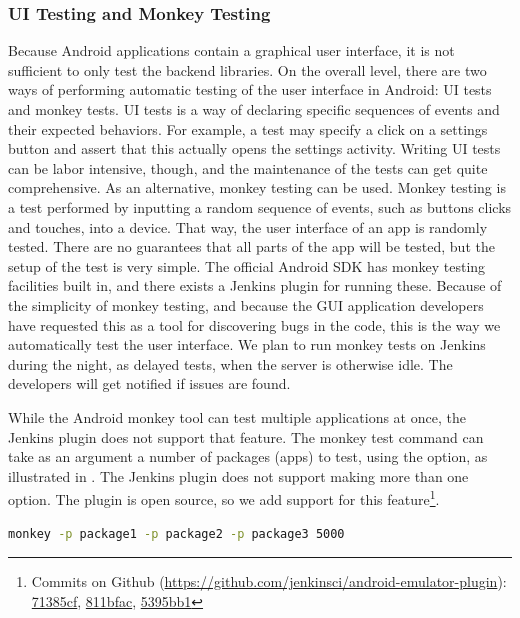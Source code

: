 \subsubsection{UI Testing and Monkey Testing}
Because Android applications contain a graphical user interface, it is not sufficient to only test the backend libraries. On the overall level, there are two ways of performing automatic testing of the user interface in Android: UI tests and monkey tests. UI tests is a way of declaring specific sequences of events and their expected behaviors. For example, a test may specify a click on a settings button and assert that this actually opens the settings activity. Writing UI tests can be labor intensive, though, and the maintenance of the tests can get quite comprehensive. As an alternative, monkey testing can be used. Monkey testing is a test performed by inputting a random sequence of events, such as buttons clicks and touches, into a device. That way, the user interface of an app is randomly tested. There are no guarantees that all parts of the app will be tested, but the setup of the test is very simple. The official Android SDK has monkey testing facilities built in, and there exists a Jenkins plugin for running these. Because of the simplicity of monkey testing, and because the GUI application developers have requested this as a tool for discovering bugs in the code, this is the way we automatically test the user interface. We plan to run monkey tests on Jenkins during the night, as delayed tests, when the server is otherwise idle. The developers will get notified if issues are found.

While the Android monkey tool can test multiple applications at once, the Jenkins plugin does not support that feature. The monkey test command can take as an argument a number of packages (apps) to test, using the  option, as illustrated in . The Jenkins plugin does not support making more than one  option. The plugin is open source, so we add support for this feature\footnote{Commits on Github (\url{https://github.com/jenkinsci/android-emulator-plugin}): \href{https://github.com/jenkinsci/android-emulator-plugin/commit/71385cfb3e3bb4dfa6d11170c52ee69808a4f72f}{71385cf},  \href{https://github.com/jenkinsci/android-emulator-plugin/commit/811bfac657565b25ce2f7fc9d6399d9f22bb6042}{811bfac}, \href{https://github.com/jenkinsci/android-emulator-plugin/commit/5395bb1fd23032cab48a7bfff61a26544f078785}{5395bb1}}.

\begin{lstlisting}[language=bash,showstringspaces=false,caption=Running monkey test on several packages. The number 5000 at the end is the number of events to generate.,label=lst:monkey_packages]
monkey -p package1 -p package2 -p package3 5000
\end{lstlisting}

